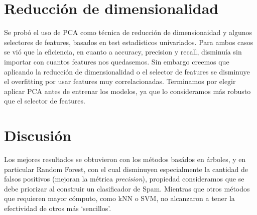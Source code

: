 \documentclass[10pt,a4paper]{article}
\begin{document}




 \section{Reducción de dimensionalidad}

Se probó el uso de PCA como técnica de reducción de dimensionaidad y algunos selectores de features, basados en test estadísticos univariados. Para ambos casos se vió que la eficiencia, en cuanto a accuracy, precision y recall, disminuía sin importar con cuantos features nos quedasemos. Sin embargo creemos que aplicando la reducción de dimensionalidad o el selector de features se disminuye el overfitting por usar features muy correlacionadas. Terminamos por elegir aplicar PCA antes de entrenar los modelos, ya que lo consideramos más robusto que el selector de features.



 \section{Discusión}

Los mejores resultados se obtuvieron con los métodos basádos en árboles, y en particular Random Forest, con el cual disminuyen especialmente la cantidad de falsos positivos (mejoran la métrica \textit{precision}), propiedad consideramos que se debe priorizar al construir un clasificador de Spam. Mientras que otros métodos que requieren mayor cómputo, como kNN o SVM, no alcanzaron a tener la efectividad de otros más `sencillos'.
\end{document}
